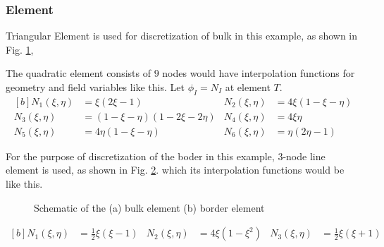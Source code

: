 \documentclass[]{article}
\begin{document}
\subsubsection{Element} \label{sec: elem}
Triangular Element is used for discretization of bulk in this example, as shown in Fig. \ref{fig:sfig1}, 


The quadratic element consists of $9$ nodes would have interpolation functions for geometry and ﬁeld variables like this. Let $\phi_{I}=N_I $ at element $T$.
\begin{equation}\label{eq11}
	\begin{aligned}[b]
		  N_{1}(\xi, \eta)  &= \xi(2\xi-1)
		& N_{2}(\xi, \eta)  &= 4\xi(1-\xi-\eta)\\
		N_{3}(\xi, \eta)  &=    (1-\xi-\eta)(1-2\xi-2\eta)
		& N_{4}(\xi, \eta)  &=  4\xi\eta\\
		N_{5}(\xi, \eta)  &= 4\eta(1-\xi-\eta)
		& N_{6}(\xi, \eta)  &= \eta(2\eta-1)
	\end{aligned}
\end{equation}

For the purpose of discretization of the boder in this example, 3-node line element is used, as shown in Fig. \ref{fig:sfig2}. which its interpolation functions would be like this.

\begin{figure}
	\begin{subfigure}{.5\textwidth}
		\centering
		
		\caption{}
		\label{fig:sfig1}
	\end{subfigure}%
	\begin{subfigure}{.5\textwidth}
		\centering
		
		\caption{}
		\label{fig:sfig2}
	\end{subfigure}
	\caption{ Schematic of the (a) bulk element (b) border element}
	\label{fig:elmnt}
\end{figure}


\begin{equation}\label{eq12}
	\begin{aligned}[b]
		N_{1}(\xi, \eta)  &=\frac{1}{2} \xi(\xi-1)
		& N_{2}(\xi, \eta)  &= 4\xi(1-\xi^2)
		& N_{3}(\xi, \eta)  &= \frac{1}{2} \xi(\xi+1)
	\end{aligned}
\end{equation}
\end{document}
